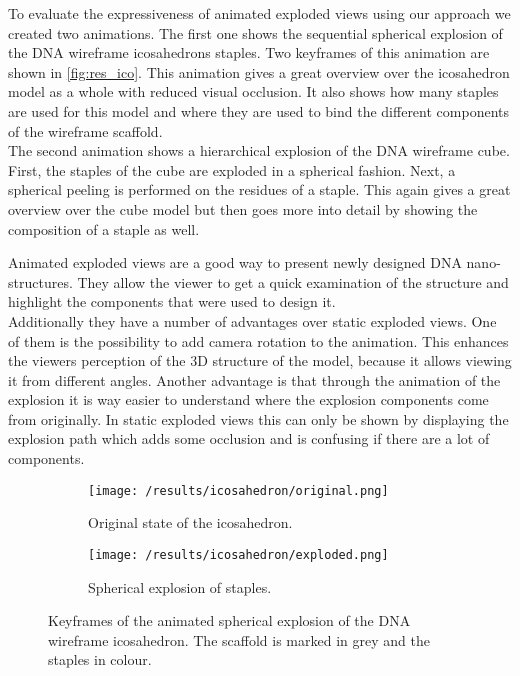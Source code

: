\documentclass[draft,final]{vutinfth} %
\begin{document}
To evaluate the expressiveness of animated exploded views using our approach we created two animations. The first one shows the sequential spherical explosion of the DNA wireframe icosahedrons staples. Two keyframes of this animation are shown in \autoref{fig:res_ico}. This animation gives a great overview over the icosahedron model as a whole with reduced visual occlusion. It also shows how many staples are used for this model and where they are used to bind the different components of the wireframe scaffold. \\ The second animation shows a hierarchical explosion of the DNA wireframe cube. First, the staples of the cube are exploded in a spherical fashion. Next, a spherical peeling is performed on the residues of a staple. This again gives a great overview over the cube model but then goes more into detail by showing the composition of a staple as well.
\par Animated exploded views are a good way to present newly designed DNA nano-structures. They allow the viewer to get a quick examination of the structure and highlight the components that were used to design it. 
\\ Additionally they have a number of advantages over static exploded views. One of them is the possibility to add camera rotation to the animation. This enhances the viewers perception of the 3D structure of the model, because it allows viewing it from different angles. Another advantage is that through the animation of the explosion it is way easier to understand where the explosion components come from originally. In static exploded views this can only be shown by displaying the explosion path which adds some occlusion and is confusing if there are a lot of components.

\begin{figure}
\centering
\begin{subfigure}{0.45\textwidth}
  \centering
  \texttt{[image: /results/icosahedron/original.png]}
  \caption{Original state of the icosahedron.}
  \label{fig:res_ico_o}
\end{subfigure}%
\quad
\begin{subfigure}{0.45\textwidth}
  \centering
  \texttt{[image: /results/icosahedron/exploded.png]}
  \caption{Spherical explosion of staples.}
  \label{fig:res_ico_e}
\end{subfigure}%

\caption{Keyframes of the animated spherical explosion of the DNA wireframe icosahedron. The scaffold is marked in grey and the staples in colour.}
\label{fig:res_ico}
\end{figure}
\end{document}
